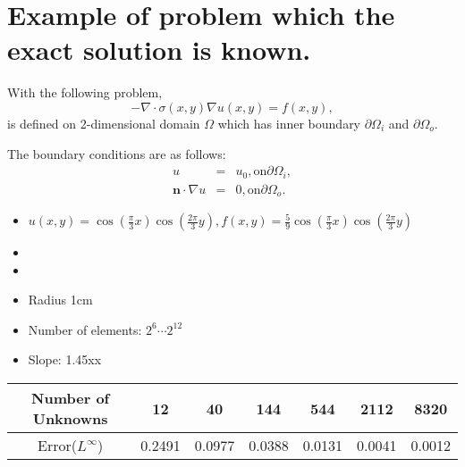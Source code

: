 \section{Example of problem which the exact solution is known.}
With the following problem,
\begin{equation}
-\nabla \cdot \sigma(x,y) \nabla u(x,y) = f(x,y),
\end{equation}
is defined on 2-dimensional domain $\Omega$ which has inner
boundary $\partial \Omega_{i}$ and $\partial \Omega_{o}$.

The boundary conditions are as follows:
\begin{eqnarray}
u&=&u_0, \mbox{on}  \partial \Omega_{i}, \\
\textbf{n} \cdot \nabla u &=& 0, \mbox{on} \partial \Omega_{o}.
\end{eqnarray}

\begin{itemize}
    \item $u(x,y) = \cos(\frac{\pi}{3}x)\cos(\frac{2\pi}{3}y),
    f(x,y) = \frac{5}{9}\cos(\frac{\pi}{3}x)\cos(\frac{2\pi}{3}y)$
    \item
    \item
\end{itemize}


\begin{itemize}
\item Radius 1cm
\item Number of elements: $2^6 \cdots 2^{12}$
\item Slope: 1.45xx
\end{itemize}





\begin{tabular}{|c||c|c|c|c|c|c|} \hline
    Number of Unknowns  &12     &40     &144    &544    &2112   &8320   \\ \hline
    Error($L^{\infty}$) &0.2491 &0.0977 &0.0388 &0.0131 &0.0041 &0.0012 \\ \hline
\end{tabular}
